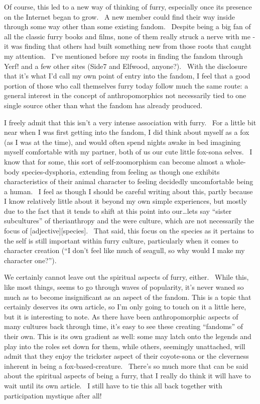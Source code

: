 Of course, this led to a new way of thinking of furry, especially once
its presence on the Internet began to grow. ~A new member could find
their way inside through some way other than some existing fandom.
~Despite being a big fan of all the classic furry books and films, none
of them really struck a nerve with me - it was finding that others had
built something new from those roots that caught my attention. ~I've
mentioned before my roots in finding the fandom through Yerf! and a few
other sites (Side7 and Elfwood, anyone?). ~With the disclosure that it's
what I'd call my own point of entry into the fandom, I feel that a good
portion of those who call themselves furry today follow much the same
route: a general interest in the concept of anthropomorphics not
necessarily tied to one single source other than what the fandom has
already produced.

I freely admit that this isn't a very intense association with furry.
~For a little bit near when I was first getting into the fandom, I did
think about myself as a fox (as I was at the time), and would often
spend nights awake in bed imagining myself comfortable with my partner,
both of us our cute little fox-sona selves. ~I know that for some, this
sort of self-zoomorphism can become almost a whole-body
species-dysphoria, extending from feeling as though one exhibits
characteristics of their animal character to feeling decidedly
uncomfortable being a human. ~I feel as though I should be careful
writing about this, partly because I know relatively little about it
beyond my own simple experiences, but mostly due to the fact that it
tends to shift at this point into our\ldots{}lets say ``sister
subcultures'' of therianthropy and the were culture, which are not
necessarily the focus of {[}adjective{]}{[}species{]}. ~That said, this
focus on the species as it pertains to the self is still important
within furry culture, particularly when it comes to character creation
(``I don't feel like much of seagull, so why would I make my character
one?'').

We certainly cannot leave out the spiritual aspects of furry, either.
~While this, like most things, seems to go through waves of popularity,
it's never waned so much as to become insignificant as an aspect of the
fandom. This is a topic that certainly deserves its own article, so I'm
only going to touch on it a little here, but it is interesting to note.
As there have been anthropomorphic aspects of many cultures back through
time, it's easy to see these creating ``fandoms'' of their own. This is
its own gradient as well: some may latch onto the legends and play into
the roles set down for them, while others, seemingly unattached, will
admit that they enjoy the trickster aspect of their coyote-sona or the
cleverness inherent in being a fox-based-creature. ~There's so much more
that can be said about the spiritual aspects of being a furry, that I
really do think it will have to wait until its own article. ~I still
have to tie this all back together with participation mystique after
all!

